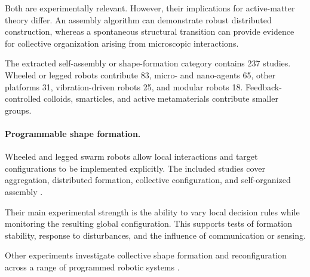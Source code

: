 Both are experimentally relevant.
However, their implications
for active-matter theory differ.
An assembly algorithm can
demonstrate robust distributed
construction, whereas a
spontaneous structural transition
can provide evidence for
collective organization arising
from microscopic interactions.

The extracted self-assembly or
shape-formation category contains
237 studies. Wheeled or legged
robots contribute 83,
micro- and nano-agents 65,
other platforms 31,
vibration-driven robots 25,
and modular robots 18.
Feedback-controlled colloids,
smarticles, and active
metamaterials contribute
smaller groups.



\paragraph*{Programmable shape formation.}

Wheeled and legged swarm robots
allow local interactions and
target configurations to be
implemented explicitly.
The included studies cover
aggregation, distributed
formation, collective
configuration, and
self-organized assembly
\cite{Yamada2011circularmotiongene,Kernbach2011threecasesofconne,Tran2022frontierledswarmin,Giardina2022collectivephototact,Vega2023indirectswarmcontr,Vega2024agentbasedemulatio,Varadharajan2026programmableflocks,Lee2022distributedcohesive,Garnier2005aggregationbehaviou,Gaget2020branchedstructuref,Baumann2024hybridflockforma,Guzzi2014bioinspiredobstacle,Hu2018ahybridvisualmode,Ercan2011swarmrobotflocking,Rezeck2026decentralizedemerge,Ferrante2013aselfadaptivecomm,Christensen2008swarmorphscripta,Li2016turinglearningam,CetinaDenis2025flockingcontrolfor,Cambier2021culturalevolutiono,Pan2026exploringthephysic}.

Their main experimental
strength is the ability
to vary local decision
rules while monitoring
the resulting global
configuration. This
supports tests of
formation stability,
response to disturbances,
and the influence
of communication
or sensing.

Other experiments
investigate collective
shape formation and
reconfiguration across
a range of programmed
robotic systems
\cite{Krishnanand2005formationsofminima,Prieto2010openendedevolution,Navarro2011aframeworkforthe,Savkin2015distributedformatio,Mendiburu2022automodemateautom,Spears2004distributedphysics,Sun2023meanshiftexplorati,Xiao2023perceptionofmotion,Fersula2026leveragingdesignfo,Salman2024automaticdesignof,Agrawal2020scalefreeprogramm,Molins2019trailformationusin,PliegoJimnez2023flockingandformati,Liu2023orderlyhysteresisi,Jin2023bioinspiredenviron,Mijalkov2016engineeringsensoria,Belta2004controlofateamof,HaiTao2015algorithmsandexper,Wang2012flockingbaseddistr,Kira2009exertinghumancontr,Hou2009ontheimplementatio,Sugawara2007collectivemotionsa,La2011decentralizedflocki,Beattie2025realizingemergentc,Cioarg2010evaluationoffishs,Sugawara2006collectivemotionan,Benedettelli2007experimentalvalidat,Lee2014distributedcohesive,StOnge2018circleformationwit,Wang2022optiswarmopticals,Li2026onfeedbackspeedco,Zhang2026noiseresilientimpl}.

